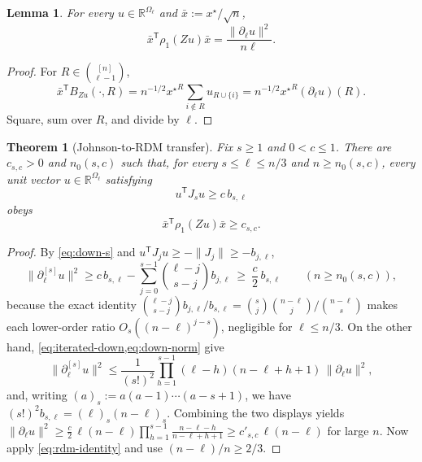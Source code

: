 \documentclass[11pt]{article}
\newtheorem{theorem}{Theorem}[section]
\newtheorem{lemma}[lemma]{Lemma}
\theoremstyle{definition}
\theoremstyle{remark}
\newcommand{\1}{\mathbf 1}
\newcommand{\xstar}{{x^\star}}
\newcommand{\rhoone}{\rho_1}
\numberwithin{equation}{section}
\begin{document}
\begin{lemma}\label{lem:rdm-identity}
For every $u\in\mathbb R^{\Omega_\ell}$ and
$\bar x:=\xstar/\sqrt n$,
\begin{equation}\label{eq:rdm-identity}
 \bar x^{\mathsf T}\rhoone(Zu)\bar x
 =\frac{\|\partial_\ell u\|^2}{n\ell}.
\end{equation}
\end{lemma}
\begin{proof}
For $R\in\binom{[n]}{\ell-1}$,
\[
 \bar x^{\mathsf T}B_{Zu}(\cdot,R)
 =n^{-1/2}\xstar^R\sum_{i\notin R}u_{R\cup\{i\}}
 =n^{-1/2}\xstar^R(\partial_\ell u)(R).
\]
Square, sum over $R$, and divide by $\ell$.
\end{proof}

\begin{theorem}[Johnson-to-RDM transfer]\label{thm:transfer}
Fix $s\ge1$ and $0<c\le1$.  There are $c_{s,c}>0$ and $n_0(s,c)$ such
that, for every $s\le\ell\le n/3$ and $n\ge n_0(s,c)$, every unit vector
$u\in\mathbb R^{\Omega_\ell}$ satisfying
\begin{equation}\label{eq:johnson-energy}
 u^{\mathsf T}J_su\ge c\,b_{s,\ell}
\end{equation}
obeys
\begin{equation}\label{eq:transfer}
 \bar x^{\mathsf T}\rhoone(Zu)\bar x\ge c_{s,c}.
\end{equation}
\end{theorem}
\begin{proof}
By \cref{eq:down-s} and $u^{\mathsf T}J_ju\ge-\|J_j\|\ge-b_{j,\ell}$,
\[
 \|\partial_\ell^{[s]}u\|^2
 \ge c\,b_{s,\ell}
 -\sum_{j=0}^{s-1}\binom{\ell-j}{s-j}b_{j,\ell}
 \ \ge\ \frac c2\,b_{s,\ell}
 \qquad(n\ge n_0(s,c)),
\]
because the exact identity
$\binom{\ell-j}{s-j}b_{j,\ell}/b_{s,\ell}
=\binom sj\binom{n-\ell}{j}/\binom{n-\ell}{s}$ makes each lower-order
ratio $O_s((n-\ell)^{j-s})$, negligible for $\ell\le n/3$.  On the
other hand, \cref{eq:iterated-down,eq:down-norm} give
\[
 \|\partial_\ell^{[s]}u\|^2
 \le\frac1{(s!)^2}
 \prod_{h=1}^{s-1}(\ell-h)(n-\ell+h+1)\,
 \|\partial_\ell u\|^2,
\]
and, writing $(a)_s:=a(a-1)\cdots(a-s+1)$, we have
$(s!)^2b_{s,\ell}=(\ell)_s(n-\ell)_s$.  Combining the two displays
yields
$\|\partial_\ell u\|^2
\ge\tfrac c2\,\ell(n-\ell)\prod_{h=1}^{s-1}
\tfrac{n-\ell-h}{n-\ell+h+1}
\ge c'_{s,c}\,\ell(n-\ell)$
for large $n$.  Now apply \cref{eq:rdm-identity} and use
$(n-\ell)/n\ge2/3$.
\end{proof}
\end{document}
